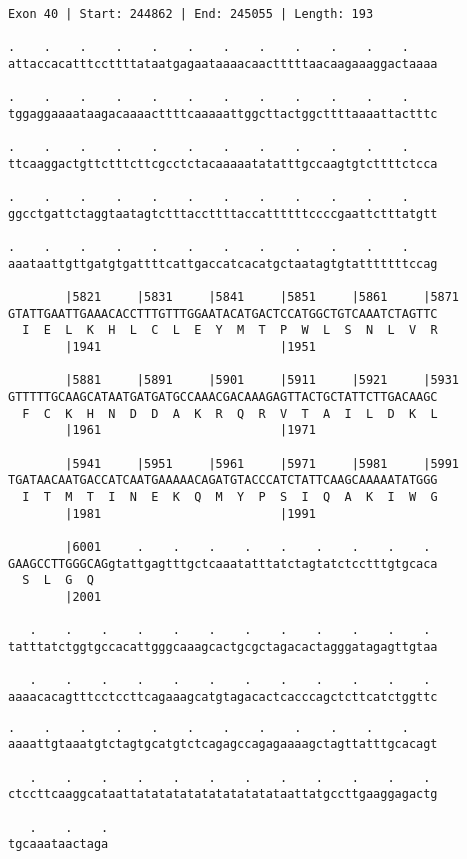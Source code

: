 \documentclass{article}
\begin{document}
\newpage
\begin{Verbatim}[fontfamily=courier]
Exon 40 | Start: 244862 | End: 245055 | Length: 193

.    .    .    .    .    .    .    .    .    .    .    .    
attaccacatttccttttataatgagaataaaacaactttttaacaagaaaggactaaaa

.    .    .    .    .    .    .    .    .    .    .    .    
tggaggaaaataagacaaaacttttcaaaaattggcttactggcttttaaaattactttc

.    .    .    .    .    .    .    .    .    .    .    .    
ttcaaggactgttctttcttcgcctctacaaaaatatatttgccaagtgtcttttctcca

.    .    .    .    .    .    .    .    .    .    .    .    
ggcctgattctaggtaatagtctttaccttttaccattttttccccgaattctttatgtt

.    .    .    .    .    .    .    .    .    .    .    .    
aaataattgttgatgtgattttcattgaccatcacatgctaatagtgtatttttttccag

        |5821     |5831     |5841     |5851     |5861     |5871
GTATTGAATTGAAACACCTTTGTTTGGAATACATGACTCCATGGCTGTCAAATCTAGTTC
  I  E  L  K  H  L  C  L  E  Y  M  T  P  W  L  S  N  L  V  R
        |1941                         |1951                 

        |5881     |5891     |5901     |5911     |5921     |5931
GTTTTTGCAAGCATAATGATGATGCCAAACGACAAAGAGTTACTGCTATTCTTGACAAGC
  F  C  K  H  N  D  D  A  K  R  Q  R  V  T  A  I  L  D  K  L
        |1961                         |1971                 

        |5941     |5951     |5961     |5971     |5981     |5991
TGATAACAATGACCATCAATGAAAAACAGATGTACCCATCTATTCAAGCAAAAATATGGG
  I  T  M  T  I  N  E  K  Q  M  Y  P  S  I  Q  A  K  I  W  G
        |1981                         |1991                 

        |6001     .    .    .    .    .    .    .    .    . 
GAAGCCTTGGGCAGgtattgagtttgctcaaatatttatctagtatctcctttgtgcaca
  S  L  G  Q                                                
        |2001                                               

   .    .    .    .    .    .    .    .    .    .    .    . 
tatttatctggtgccacattgggcaaagcactgcgctagacactagggatagagttgtaa

   .    .    .    .    .    .    .    .    .    .    .    . 
aaaacacagtttcctccttcagaaagcatgtagacactcacccagctcttcatctggttc

\end{Verbatim}
\newpage
\begin{Verbatim}[fontfamily=courier]
   .    .    .    .    .    .    .    .    .    .    .    . 
aaaattgtaaatgtctagtgcatgtctcagagccagagaaaagctagttatttgcacagt

   .    .    .    .    .    .    .    .    .    .    .    . 
ctccttcaaggcataattatatatatatatatatatataattatgccttgaaggagactg

   .    .    .
tgcaaataactaga
\end{Verbatim}
\end{document}
